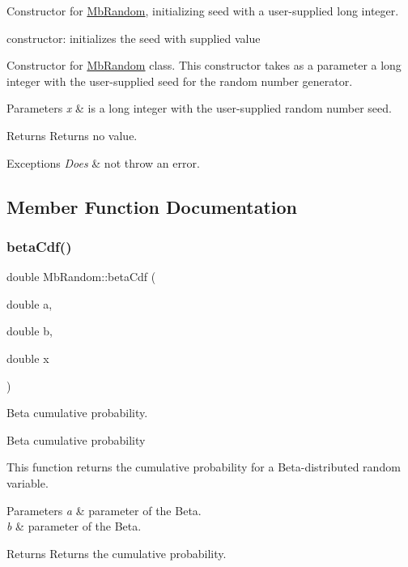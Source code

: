 Constructor for \mbox{\hyperlink{class_mb_random}{Mb\+Random}}, initializing seed with a user-\/supplied long integer. 

constructor\+: initializes the seed with supplied value

Constructor for \mbox{\hyperlink{class_mb_random}{Mb\+Random}} class. This constructor takes as a parameter a long integer with the user-\/supplied seed for the random number generator.


\begin{DoxyParams}{Parameters}
{\em x} & is a long integer with the user-\/supplied random number seed. \\
\hline
\end{DoxyParams}
\begin{DoxyReturn}{Returns}
Returns no value. 
\end{DoxyReturn}

\begin{DoxyExceptions}{Exceptions}
{\em Does} & not throw an error. \\
\hline
\end{DoxyExceptions}


\subsection{Member Function Documentation}
\mbox{\label{class_mb_random_a25c29accd700da05a331f46a4151d6ce}} 
\subsubsection{\texorpdfstring{betaCdf()}{betaCdf()}}
{\footnotesize\ttfamily double Mb\+Random\+::beta\+Cdf (\begin{DoxyParamCaption}\item[{double}]{a,  }\item[{double}]{b,  }\item[{double}]{x }\end{DoxyParamCaption})}



Beta cumulative probability. 

Beta cumulative probability

This function returns the cumulative probability for a Beta-\/distributed random variable.


\begin{DoxyParams}{Parameters}
{\em a} & parameter of the Beta. \\
\hline
{\em b} & parameter of the Beta. \\
\hline
\end{DoxyParams}
\begin{DoxyReturn}{Returns}
Returns the cumulative probability. 
\end{DoxyReturn}

